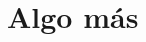 \documentclass[./../main.tex]{subfiles}
\begin{document}
    \section{Algo más}
    \kant[1-4]
\end{document}
